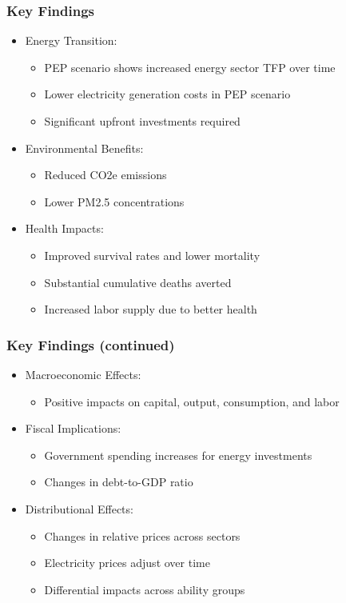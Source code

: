 \documentclass{beamer}
\begin{document}
\begin{frame}
  \frametitle{Key Findings}

  \begin{itemize}
    \item Energy Transition:
      \begin{itemize}
        \item PEP scenario shows increased energy sector TFP over time
        \item Lower electricity generation costs in PEP scenario
        \item Significant upfront investments required
      \end{itemize}
    \item Environmental Benefits:
      \begin{itemize}
        \item Reduced CO2e emissions
        \item Lower PM2.5 concentrations
      \end{itemize}
    \item Health Impacts:
      \begin{itemize}
        \item Improved survival rates and lower mortality
        \item Substantial cumulative deaths averted
        \item Increased labor supply due to better health
      \end{itemize}
  \end{itemize}
\end{frame}


\begin{frame}
  \frametitle{Key Findings (continued)}

  \begin{itemize}
    \item Macroeconomic Effects:
      \begin{itemize}
        \item Positive impacts on capital, output, consumption, and labor
      \end{itemize}
    \item Fiscal Implications:
      \begin{itemize}
        \item Government spending increases for energy investments
        \item Changes in debt-to-GDP ratio
      \end{itemize}
    \item Distributional Effects:
      \begin{itemize}
        \item Changes in relative prices across sectors
        \item Electricity prices adjust over time
        \item Differential impacts across ability groups
      \end{itemize}
  \end{itemize}
\end{frame}
\end{document}
